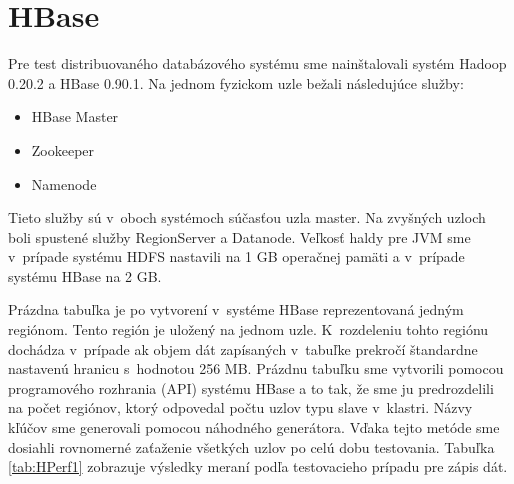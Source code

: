\documentclass[11pt,twoside,a4paper]{book}
\begin{document}

\section{HBase}

Pre test distribuovaného databázového systému sme nainštalovali systém Hadoop 0.20.2 a HBase 0.90.1. Na jednom fyzickom uzle bežali následujúce služby:

\begin{itemize}
 \item HBase Master
 \item Zookeeper
 \item Namenode 
\end{itemize}

Tieto služby sú v~oboch systémoch súčasťou uzla master. Na zvyšných uzloch boli spustené služby RegionServer a Datanode. Veľkosť haldy pre JVM sme v~prípade systému HDFS nastavili na 1 GB operačnej pamäti a v~prípade systému HBase na 2 GB.

Prázdna tabuľka je po vytvorení v~systéme HBase reprezentovaná  jedným regiónom. Tento región je uložený na jednom uzle. K~rozdeleniu tohto regiónu dochádza v~prípade ak objem dát zapísaných v~tabuľke prekročí štandardne nastavenú hranicu s~hodnotou 256 MB. Prázdnu tabuľku sme vytvorili pomocou programového rozhrania (API) systému HBase a to tak, že sme ju predrozdelili na počet regiónov, ktorý odpovedal počtu uzlov typu slave v~klastri. Názvy kľúčov sme generovali pomocou náhodného generátora. Vďaka tejto metóde sme dosiahli rovnomerné zaťaženie všetkých uzlov po celú dobu testovania. Tabuľka \ref{tab:HPerf1} zobrazuje výsledky meraní podľa testovacieho prípadu pre zápis dát. 


 
\end{document}
